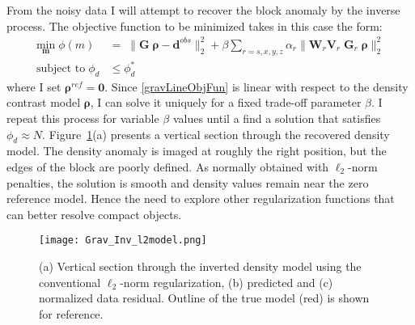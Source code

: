 From the noisy data I will attempt to recover the block anomaly by the inverse process. The objective function to be minimized takes in this case the form:
\begin{equation}
\begin{split}
\underset{\mathbf{m}}{\text{min}}\; \phi(m) & = \; \|\mathbf{G}\;\boldsymbol{\rho} - \mathbf{d}^{obs}\|_2^2 + \beta \sum_{r=s,x,y,z} \alpha_r \|\mathbf{W}_r \mathbf{V}_r \;\mathbf{G}_r \;\boldsymbol{\rho}\|_2^2 \\
\text{subject to} \; \phi_d & \leq \phi_d^* \;
\end{split}\label{gravLineObjFun}
\end{equation}
where I set $\boldsymbol{\rho}^{ref}=\mathbf{0}$.
Since \eqref{gravLineObjFun} is linear with respect to the density contrast model $\boldsymbol{\rho}$, I can solve it uniquely for a fixed trade-off parameter $\beta$. I repeat this process for variable $\beta$ values until a find a solution that satisfies $\phi_d \approx N$. 
Figure~\ref{Grav_l2model}(a) presents a vertical section through the recovered density model. The density anomaly is imaged at roughly the right position, but the edges of the block are poorly defined. As normally obtained with $\ell_2$-norm penalties, the solution is smooth and density values remain near the zero reference model. Hence the need to explore other regularization functions that can better resolve compact objects.
\begin{figure}
\texttt{[image: Grav\_Inv\_l2model.png]}
\caption{(a) Vertical section through the inverted density model using the conventional $\ell_2$-norm regularization, (b) predicted and (c) normalized data residual. Outline of the true model (red) is shown for reference.}
\label{Grav_l2model}
\end{figure}


